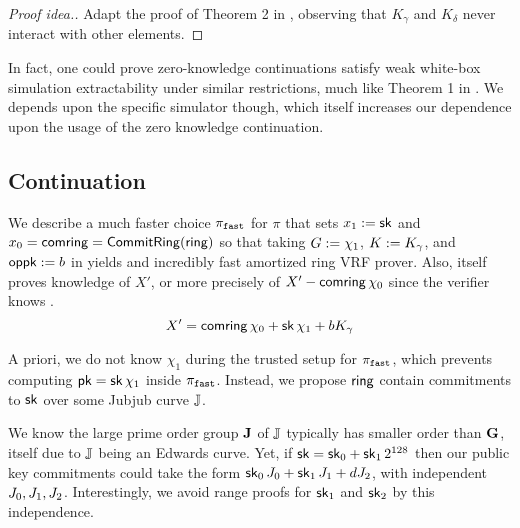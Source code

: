 \begin{proof}[Proof idea.]
Adapt the proof of Theorem 2 in \cite[\S3, pp. 9]{RandomizationGroth16},
observing that $K_\gamma$ and $K_\delta$ never interact with other elements. 
\end{proof}


In fact, one could prove zero-knowledge continuations satisfy
weak white-box simulation extractability under similar restrictions,
much like Theorem 1 in \cite[\S3, pp. 8 \& 11]{RandomizationGroth16}.
We depends upon the specific simulator though, which itself increases
our dependence upon the usage of the zero knowledge continuation.


\subsection{Continuation}
\label{subsec:rvrf_faster}


We describe a much faster choice $\pi_{\mathtt{fast}}$ for $\pi$
that sets $x_1 := \mathsf{sk}$ and $x_0 = \mathsf{comring} = {\mathsf{CommitRing}}(\mathsf{ring})$ so that
taking $G := \chi_1$, $K := K_\gamma$, and $\mathsf{oppk} := b$ in \PedVRF
yields and incredibly fast amortized ring VRF prover.
Also, \PedVRF itself proves knowledge of $X'$,
 or more precisely of $X' - \mathsf{comring}\, \chi_0$ since the verifier knows \comring.
$$ X' = \mathsf{comring}\, \chi_0 + \mathsf{sk}\, \chi_1 + b K_\gamma $$


A priori, we do not know $\chi_1$ during the trusted setup for $\pi_{\mathtt{fast}}$,
which prevents computing $\mathsf{pk} = \mathsf{sk}\, \chi_1$ inside $\pi_{\mathtt{fast}}$.
Instead, we propose $\mathsf{ring}$ contain commitments to $\mathsf{sk}$ over
some Jubjub curve ${\mathbb{J}}$.  

We know the large prime order group ${\mathbf{J}}$ of ${\mathbb{J}}$ typically has
smaller order than ${\mathbf{G}}$, itself due to ${\mathbb{J}}$ being an Edwards curve. 
Yet, if $\mathsf{sk} = \mathsf{sk}_0 + \mathsf{sk}_1 \, 2^{128}$ then our public key commitments could
take the form $\mathsf{sk}_0\, J_0 + \mathsf{sk}_1\, J_1 + d J_2$,
with independent $J_0,J_1,J_2$.
Interestingly, we avoid range proofs for $\mathsf{sk}_1$ and $\mathsf{sk}_2$
by this independence. 

